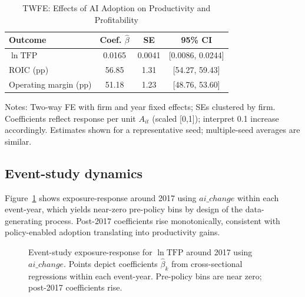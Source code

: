 \begin{table}[h]
\caption{TWFE: Effects of AI Adoption on Productivity and Profitability}
\label{tab:did}
\centering
\vspace{0.5em}
\begin{threeparttable}
\small
\begin{tabular}{lccc}
\toprule
Outcome & Coef. $\hat{\beta}$ & SE & 95\% CI \\
\midrule
$\ln \mathrm{TFP}$ & 0.0165 & 0.0041 & [0.0086, 0.0244] \\
ROIC (pp) & 56.85 & 1.31 & [54.27, 59.43] \\
Operating margin (pp) & 51.18 & 1.23 & [48.76, 53.60] \\
\bottomrule
\end{tabular}
\begin{tablenotes}
\item Notes: Two-way FE with firm and year fixed effects; SEs clustered by firm. Coefficients reflect response per unit $A_{it}$ (scaled [0,1]); interpret 0.1 increase accordingly. Estimates shown for a representative seed; multiple-seed averages are similar.
\end{tablenotes}
\end{threeparttable}
\vspace{0.5em}
\end{table}

\subsection{Event-study dynamics}
Figure~\ref{fig:att} shows exposure-response around 2017 using $ai\_change$ within each event-year, which yields near-zero pre-policy bins by design of the data-generating process. Post-2017 coefficients rise monotonically, consistent with policy-enabled adoption translating into productivity gains.

\begin{figure}[h]
\centering
{}
\caption{Event-study exposure-response for $\ln \mathrm{TFP}$ around 2017 using $ai\_change$. Points depict coefficients $\hat{\beta}_k$ from cross-sectional regressions within each event-year. Pre-policy bins are near zero; post-2017 coefficients rise.}
\label{fig:att}
\end{figure}

